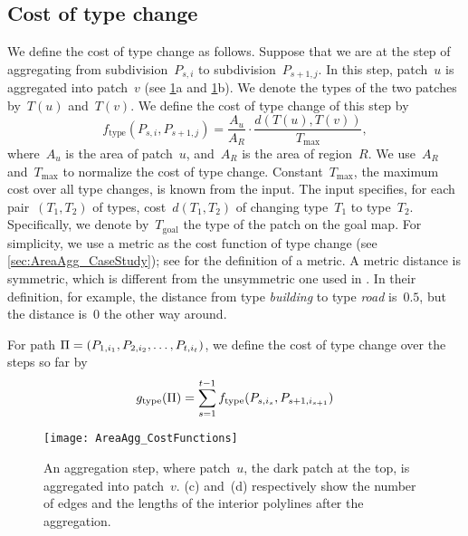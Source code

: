 \subsection{Cost of type change}
\label{sec:AreaAgg_f_type}

We define the cost of type change as follows.
Suppose that we are at the step of aggregating 
from subdivision~$P_{s,i}$ to subdivision~$P_{s+1,j}$. 
In this step, patch~$u$ is aggregated into patch~$v$
(see \figs\ref{fig:AreaAgg_FirstStep}a 
and \ref{fig:AreaAgg_FirstStep}b).
We denote the types of the two patches by~$T(u)$ and~$T(v)$. 
We define the cost of type change of this step by
\begin{equation}
\label{eq:f_type}
f_\mathrm{type}(P_{s,i},P_{s+1,j})=\frac{A_{u}}{A_R}
\cdot
\frac{d(T(u),T(v))}{T_{\max}},
\end{equation}
where~$A_u$ is the area of patch~$u$, 
and~$A_R$ is the area of region~$R$.
We use~$A_R$ and~$T_{\max}$ 
to normalize the cost of type change. 
Constant~$T_{\max}$, the maximum cost over all type changes,  
is known from the input. 
The input specifies, for each pair~$(T_1,T_2)$ of types, 
cost~$d(T_1,T_2)$ of changing type~$T_1$ to type~$T_2$.
Specifically, we denote by~$T_\mathrm{goal}$ the type of 
the patch on the goal map.
For simplicity, we use a metric 
as the cost function of type change
(see \sect\ref{sec:AreaAgg_CaseStudy}); 
see \textcite[chapter 2]{Choudhary1992Elements}
for the definition of a metric.
A metric distance is symmetric, 
which is different from the unsymmetric one used in
\textcite{Dilo2009tGAP}.
In their definition, for example, 
the distance from type \emph{building} to type \emph{road} is~$0.5$,
but the distance is~$0$ the other way around.

For path $\Pi=(P_{1,i_1}, P_{2,i_2}, \dots, 
P_{t,i_{t}})$,
we define the cost of type change over the steps so far by
\begin{equation}
\label{eq:g_type}
g_\mathrm{type}(\Pi)=
\sum_{s=1}^{t-1}f_\mathrm{type}(P_{s,i_s},P_{s+1,i_{s+1}})
\end{equation}

\begin{figure}[tb]
\centering
\texttt{[image: AreaAgg\_CostFunctions]}
\caption{An aggregation step, 
	where patch~$u$, the dark patch at the top,
	is aggregated into patch~$v$.
	\figs(c) and~(d) respectively show the number of 
	edges and the lengths of the interior polylines after 
	the aggregation.}
\label{fig:AreaAgg_FirstStep}	
\end{figure}

